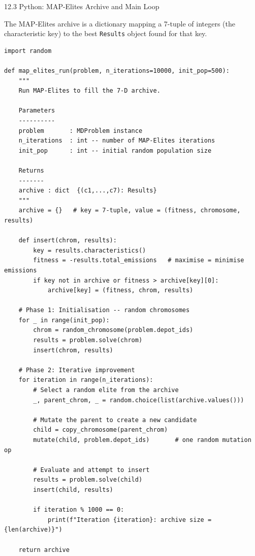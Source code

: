 \documentclass[aspectratio=169,10pt]{beamer}
\begin{document}
\begin{frame}[fragile]{12.3 Python: MAP-Elites Archive and Main Loop}

The MAP-Elites archive is a dictionary mapping
a 7-tuple of integers (the characteristic key) to the best
\texttt{Results} object found for that key.

\begin{lstlisting}[caption={MAP-Elites archive and search loop}]
import random

def map_elites_run(problem, n_iterations=10000, init_pop=500):
    """
    Run MAP-Elites to fill the 7-D archive.

    Parameters
    ----------
    problem       : MDProblem instance
    n_iterations  : int -- number of MAP-Elites iterations
    init_pop      : int -- initial random population size

    Returns
    -------
    archive : dict  {(c1,...,c7): Results}
    """
    archive = {}   # key = 7-tuple, value = (fitness, chromosome, results)

    def insert(chrom, results):
        key = results.characteristics()
        fitness = -results.total_emissions   # maximise = minimise emissions
        if key not in archive or fitness > archive[key][0]:
            archive[key] = (fitness, chrom, results)

    # Phase 1: Initialisation -- random chromosomes
    for _ in range(init_pop):
        chrom = random_chromosome(problem.depot_ids)
        results = problem.solve(chrom)
        insert(chrom, results)

    # Phase 2: Iterative improvement
    for iteration in range(n_iterations):
        # Select a random elite from the archive
        _, parent_chrom, _ = random.choice(list(archive.values()))

        # Mutate the parent to create a new candidate
        child = copy_chromosome(parent_chrom)
        mutate(child, problem.depot_ids)       # one random mutation op

        # Evaluate and attempt to insert
        results = problem.solve(child)
        insert(child, results)

        if iteration % 1000 == 0:
            print(f"Iteration {iteration}: archive size = {len(archive)}")

    return archive
\end{lstlisting}

\end{frame}
\end{document}
